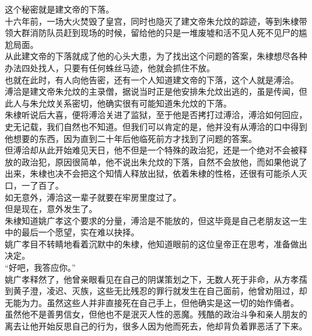 \begin{multicols}{\theparacolNo}
这个秘密就是建文帝的下落。\\

十六年前，一场大火焚毁了皇宫，同时也隐灭了建文帝朱允炆的踪迹，等到朱棣带领大群消防队员赶到现场的时候，留给他的只是一堆废墟和活不见人死不见尸的尴尬局面。\\

从此建文帝的下落就成了他的心头大患，为了找出这个问题的答案，朱棣想尽各种办法四处找人，只要有任何蛛丝马迹，他就会抓住不放。\\

也就在此时，有人向他告密，还有一个人知道建文帝的下落，这个人就是溥洽。\\

溥洽是建文帝朱允炆的主录僧，据说当时正是他安排朱允炆出逃的，虽是传闻，但此人与朱允炆关系密切，他确实很有可能知道朱允炆的下落。\\

朱棣听说后大喜，便将溥洽关进了监狱，至于他是否拷打过溥洽，溥洽如何回应，史无记载，我们自然也不知道。但我们可以肯定的是，他并没有从溥洽的口中得到他想要的东西，因为直到二十年后他临死前方才找到了问题的答案。\\

但溥洽却从此开始难见天日，他不但是一个特殊的政治犯，还是一个绝对不会被释放的政治犯，原因很简单，他不说出朱允炆的下落，自然不会放他，而如果他说了出来，朱棣也决不会把这个知情人释放出狱，依着朱棣的性格，还很有可能杀人灭口，一了百了。\\

如无意外，溥洽这一辈子就要在牢房里度过了。\\

但是现在，意外发生了。\\

朱棣知道姚广孝这个要求的分量，溥洽是不能放的，但这毕竟是自己老朋友这一生中的最后一个愿望，实在难以抉择。\\

姚广孝目不转睛地看着沉默中的朱棣，他知道眼前的这位皇帝正在思考，准备做出决定。\\

“好吧，我答应你。”\\

姚广孝释然了，他曾亲眼看见在自己的阴谋策划之下，无数人死于非命，从方孝孺到黄子澄，凌迟、灭族，这些无比残忍的罪行就发生在自己面前，他曾劝阻过，却无能为力。虽然这些人并非直接死在自己手上，但他确实是这一切的始作俑者。\\

虽然他不是善男信女，但他也不是泯灭人性的恶魔。残酷的政治斗争和亲人朋友的离去让他开始反思自己的行为，很多人因为他而死去，他却背负着罪恶活了下来。\\


\end{multicols}
